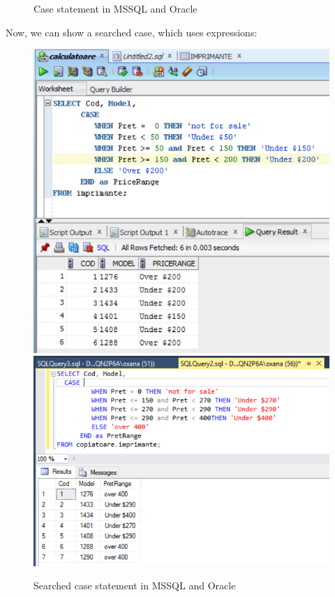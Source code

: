 \begin{itemize}
\begin{figure}[ht!]
    \caption{Case statement in MSSQL and Oracle}
    \label{fig1}
\end{figure}

Now, we can show a searched case, which uses expressions:

\begin{figure}[ht!]
    \centering
	\includegraphics[scale=0.7]{images/example4-searchedcase.png}
    \includegraphics[scale=0.7]{images/example4a-searchedcase.png}
    \caption{Searched case statement in MSSQL and Oracle}
    \label{fig1}
\end{figure}



\end{itemize}
